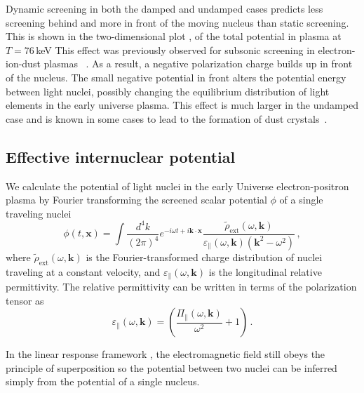 Dynamic screening in both the damped and undamped cases predicts less screening behind and more in front of the moving nucleus than static screening. This is shown in the two-dimensional plot , of the total potential in plasma at $T=76\,$keV This effect was previously observed for subsonic screening in electron-ion-dust plasmas ~\cite{Stenflo:1973,Shukla:2002ppcf,Lampe:2000pop}. As a result, a negative polarization charge builds up in front of the nucleus. The small negative potential in front alters the potential energy between light nuclei, possibly changing the equilibrium distribution of light elements in the early universe plasma. This effect is much larger in the undamped case and is known in some cases to lead to the formation of dust crystals~\cite{Shukla:1996ccc}. 

\subsection{Effective internuclear potential}\label{sec:potential}
We calculate the potential of light nuclei in the early Universe electron-positron plasma by Fourier transforming the screened scalar potential $\phi$ of a single traveling nuclei 
\begin{equation}\label{eq:potent}
 \phi(t,\boldsymbol{x}) = \int \frac{d^4k}{(2\pi)^4} e^{-i\omega t+ i\boldsymbol{k}\cdot\boldsymbol{x}} \frac{\widetilde{\rho}_\text{ext}(\omega,\boldsymbol{k})}{\varepsilon_\parallel(\omega,\boldsymbol{k})(\boldsymbol{k}^2-\omega^2) }\,,
\end{equation}
where $\widetilde{\rho}_{\text{ext}}(\omega,\boldsymbol{k})$ is the Fourier-transformed charge distribution of nuclei traveling at a constant velocity, and $\varepsilon_\parallel(\omega,\boldsymbol{k})$ is the longitudinal relative permittivity. The relative permittivity can be written in terms of the polarization tensor as
\begin{equation}\label{eq:epsilon}
 \varepsilon_\parallel(\omega,\boldsymbol{k})= \left(\frac{\Pi_{\parallel}(\omega,\boldsymbol{k})}{ \omega^2}+1\right)\,.
\end{equation}

In the linear response framework , the electromagnetic field still obeys the principle of superposition so the potential between two nuclei can be inferred simply from the potential of a single nucleus. 

